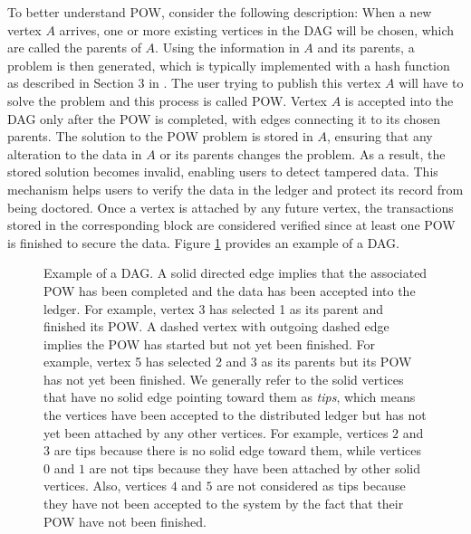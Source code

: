 \documentclass[12pt]{article}
\numberwithin{equation}{section}  %
\begin{document}
To better understand POW, consider the following description: When a new vertex $A$ arrives, one or more existing vertices in the DAG will be chosen, which are called the parents of $A$. Using the information in $A$ and its parents, a problem is then generated, which is typically implemented with a hash function as described in Section 3 in \cite{back2002hashcash}. The user trying to publish this vertex $A$ will have to solve the problem and this process is called POW. Vertex $A$ is accepted into the DAG only after the POW is completed, with edges connecting it to its chosen parents. The solution to the POW problem is stored in $A$, ensuring that any alteration to the data in $A$ or its parents changes the problem. As a result, the stored solution becomes invalid, enabling users to detect tampered data. This mechanism helps users to verify the data in the ledger and protect its record from being doctored. Once a vertex is attached by any future vertex, the transactions stored in the corresponding block are considered verified since at least one POW is finished to secure the data. Figure \ref{kchoice_demon_graph1} provides an example of a DAG.

\begin{figure}
\centering
{}
\caption{Example of a DAG. A solid directed edge implies that the associated POW has been completed and the data has been accepted into the ledger. For example, vertex 3 has selected 1 as its parent and finished its POW. A dashed vertex with outgoing dashed edge implies the POW has started but not yet been finished. For example, vertex 5 has selected 2 and 3 as its parents but its POW has not yet been finished. We generally refer to the solid vertices that have no solid edge pointing toward them as \textit{tips}, which means the vertices have been accepted to the distributed ledger but has not yet been attached by any other vertices. For example, vertices $2$ and $3$ are tips because there is no solid edge toward them, while vertices $0$ and $1$ are not tips because they have been attached by other solid vertices. Also, vertices $4$ and $5$ are not considered as tips because they have not been accepted to the system by the fact that their POW have not been finished.}
\label{kchoice_demon_graph1}
\end{figure}
\end{document}
